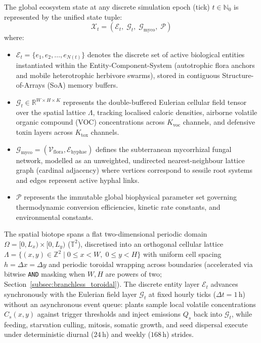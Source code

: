 The global ecosystem state at any discrete simulation epoch (tick) $t \in \mathbb{N}_0$ is represented by the unified state tuple:
\begin{equation}
  \mathcal{X}_t = \left( \mathcal{E}_t, \; \mathcal{G}_t, \; \mathcal{G}_{\text{myco}}, \; \mathcal{P} \right)
  \label{eq:global_state_tuple}
\end{equation}
where:
\begin{itemize}
  \item $\mathcal{E}_t = \{ e_1, e_2, \dots, e_{N(t)} \}$ denotes the discrete set of active biological entities instantiated within the Entity-Component-System (autotrophic flora anchors and mobile heterotrophic herbivore swarms), stored in contiguous Structure-of-Arrays (SoA) memory buffers.
  \item $\mathcal{G}_t \in \mathbb{R}^{W \times H \times K}$ represents the double-buffered Eulerian cellular field tensor over the spatial lattice $\Lambda$, tracking localised caloric densities, airborne volatile organic compound (VOC) concentrations across $K_{\text{voc}}$ channels, and defensive toxin layers across $K_{\text{tox}}$ channels.
  \item $\mathcal{G}_{\text{myco}} = (\mathcal{V}_{\text{flora}}, \mathcal{E}_{\text{hyphae}})$ defines the subterranean mycorrhizal fungal network, modelled as an unweighted, undirected nearest-neighbour lattice graph (cardinal adjacency) where vertices correspond to sessile root systems and edges represent active hyphal links.
  \item $\mathcal{P}$ represents the immutable global biophysical parameter set governing thermodynamic conversion efficiencies, kinetic rate constants, and environmental constants.
\end{itemize}

The spatial biotope spans a flat two-dimensional periodic domain $\Omega = [0, L_x) \times [0, L_y)$ ($\mathbb{T}^2$), discretised into an orthogonal cellular lattice $\Lambda = \{ (x, y) \in \mathbb{Z}^2 \mid 0 \le x < W, \; 0 \le y < H \}$ with uniform cell spacing $h = \Delta x = \Delta y$ and periodic toroidal wrapping across boundaries (accelerated via bitwise \texttt{AND} masking when $W, H$ are powers of two; Section~\ref{subsec:branchless_toroidal}). The discrete entity layer $\mathcal{E}_t$ advances synchronously with the Eulerian field layer $\mathcal{G}_t$ at fixed hourly ticks ($\Delta t = 1\,\text{h}$) without an asynchronous event queue: plants sample local volatile concentrations $C_s(x, y)$ against trigger thresholds and inject emissions $Q_s$ back into $\mathcal{G}_t$, while feeding, starvation culling, mitosis, somatic growth, and seed dispersal execute under deterministic diurnal ($24\,\text{h}$) and weekly ($168\,\text{h}$) strides.

